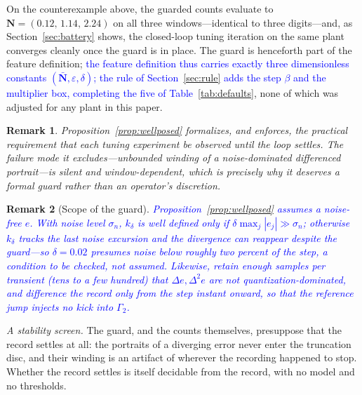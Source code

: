 \documentclass[final,3p,times,twocolumn]{elsarticle}
\newcommand{\rev}[1]{\textcolor{blue}{#1}}  %
\newcommand{\revc}[1]{\textcolor{blue}{#1}} %
\newcommand{\revh}[1]{\textcolor{blue}{#1}} %
\newtheorem{remark}{Remark}
\begin{document}
On the counterexample above, the guarded counts evaluate to
$\mathbf N = (0.12,\, 1.14,\, 2.24)$ on all three windows---identical to
three digits---and, as Section~\ref{sec:battery} shows, the closed-loop
tuning iteration on the same plant converges cleanly once the guard is in
place. The guard is henceforth part of the feature definition;
\revh{the feature definition thus carries exactly three dimensionless
constants $(\bar{\mathbf N}, \varepsilon, \delta)$; the rule of
Section~\ref{sec:rule} adds the step $\beta$ and the multiplier box,
completing the five of Table~\ref{tab:defaults}}, none of which was
adjusted for any plant in this paper.

\begin{remark}
Proposition~\ref{prop:wellposed} formalizes, and enforces, the practical
requirement that each tuning experiment be observed until the loop
settles. The failure mode it excludes---unbounded winding of a
noise-dominated differenced portrait---is silent and window-dependent,
which is precisely why it deserves a formal guard rather than an
operator's discretion.
\end{remark}

\begin{remark}[Scope of the guard]\label{rem:noise}
\rev{Proposition~\ref{prop:wellposed} assumes a noise-free $e$. With
noise level $\sigma_n$, $k_\delta$ is well defined only if
$\delta \max_j |e_j| \gg \sigma_n$; otherwise $k_\delta$ tracks the last
noise excursion and the divergence can reappear despite the guard---so
$\delta = 0.02$ presumes noise below roughly two percent of the step, a
condition to be checked, not assumed. Likewise, retain enough samples
per transient (tens to a few hundred) that $\Delta e, \Delta^2 e$ are
not quantization-dominated, \revc{and difference the record only from the step instant
onward, so that the reference jump injects no kick into}
$\Gamma_2$.}
\end{remark}

\emph{A stability screen.} The guard, and the counts themselves, presuppose
that the record settles at all: the portraits of a diverging error never
enter the truncation disc, and their winding is an artifact of wherever
the recording happened to stop. Whether the record settles is itself
decidable from the record, with no model and no thresholds.
\end{document}
